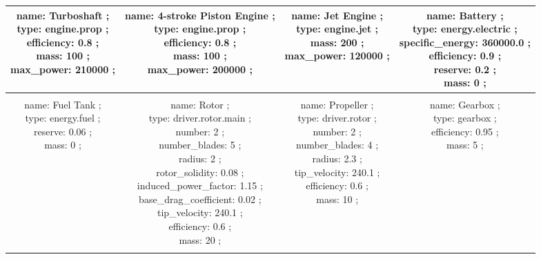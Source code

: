 \begin{table}[h]
\begin{adjustbox}{width=1\textwidth}
\begin{tabular}{|c|c|c|c|}
\makecell{name: Turboshaft ; \\ type: engine.prop ; \\ efficiency: 0.8 ; \\ mass: 100 ; \\ max\_power: 210000 ; \\ } & \makecell{name: 4-stroke Piston Engine ; \\ type: engine.prop ; \\ efficiency: 0.8 ; \\ mass: 100 ; \\ max\_power: 200000 ; \\ } & \makecell{name: Jet Engine ; \\ type: engine.jet ; \\ mass: 200 ; \\ max\_power: 120000 ; \\ } & \makecell{name: Battery ; \\ type: energy.electric ; \\ specific\_energy: 360000.0 ; \\ efficiency: 0.9 ; \\ reserve: 0.2 ; \\ mass: 0 ; \\ }\\ \hline \\ 
\makecell{name: Fuel Tank ; \\ type: energy.fuel ; \\ reserve: 0.06 ; \\ mass: 0 ; \\ } & \makecell{name: Rotor ; \\ type: driver.rotor.main ; \\ number: 2 ; \\ number\_blades: 5 ; \\ radius: 2 ; \\ rotor\_solidity: 0.08 ; \\ induced\_power\_factor: 1.15 ; \\ base\_drag\_coefficient: 0.02 ; \\ tip\_velocity: 240.1 ; \\ efficiency: 0.6 ; \\ mass: 20 ; \\ } & \makecell{name: Propeller ; \\ type: driver.rotor ; \\ number: 2 ; \\ number\_blades: 4 ; \\ radius: 2.3 ; \\ tip\_velocity: 240.1 ; \\ efficiency: 0.6 ; \\ mass: 10 ; \\ } & \makecell{name: Gearbox ; \\ type: gearbox ; \\ efficiency: 0.95 ; \\ mass: 5 ; \\ }\\ \hline \\ 

\end{tabular}
\end{adjustbox}
\end{table}
